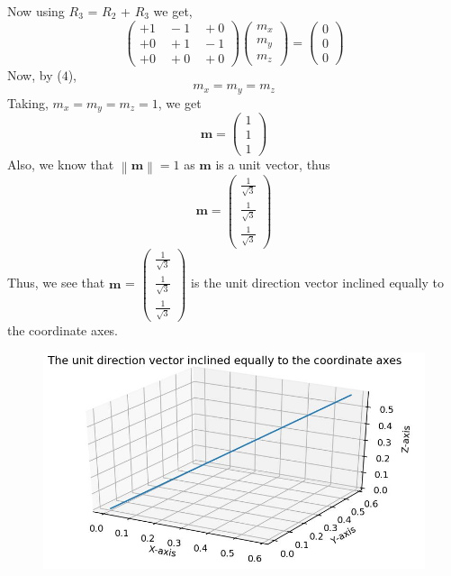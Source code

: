 \documentclass{article}
\newcommand{\myvec}[1]{\ensuremath{\begin{pmatrix}#1\end{pmatrix}}}
\newcommand{\norm}[1]{\left\lVert#1\right\rVert}
\let\vec\mathbf
\begin{document}
Now using $R_3$ = $R_2$ + $R_3$ we get,
\begin{equation}
\myvec{+1 \quad  -1 \quad +0 \\ +0 \quad +1 \quad -1 \\ +0 \quad +0 \quad +0 }\myvec{m_x \\ m_y \\ m_z} = \myvec{0 \\ 0 \\ 0}
\end{equation}
Now, by ($4$),
\begin{equation*}
m_x = m_y = m_z
\end{equation*}
Taking, $m_x = m_y = m_z =1$, we get
\begin{equation*}
\vec{m} = \myvec{1 \\ 1 \\1}
\end{equation*}
Also, we know that $\norm{\vec{m}}=1$ as $\vec{m}$ is a unit vector, thus
\begin{equation*}
\vec{m} = \myvec{\frac{1}{\sqrt{3}} \\ \frac{1}{\sqrt{3}} \\ \frac{1}{\sqrt{3}}}
\end{equation*}
Thus, we see that  $\vec{m}$ = $\myvec{ \frac{1}{\sqrt{3}} \\ \frac{1}{\sqrt{3}} \\ \frac{1}{\sqrt{3}}}$ is the unit direction vector inclined equally to the coordinate axes.\\
\begin{figure}[!htb]
	
	\centering
	
	\includegraphics[width=\columnwidth]{assignment1figure.jpg}
	
	\caption{\label{fig1}}
	
	\label{fig:}
	
\end{figure}
\end{document}
